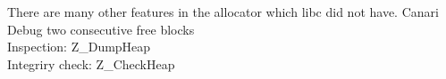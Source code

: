There are many other features in the allocator which libc  did not have. Canari\\
Debug two consecutive free blocks\\
Inspection: Z\_DumpHeap\\
Integriry check: Z\_CheckHeap\\

\pagebreak
